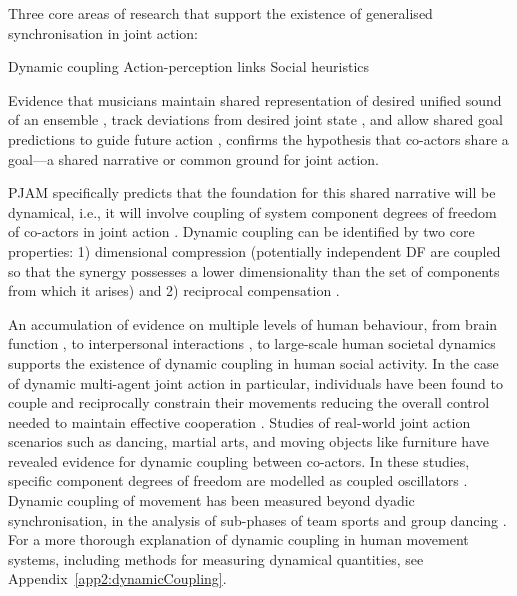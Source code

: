 \begin{CJK}{UTF8}{gbsn}
Three core areas of research that support the existence of generalised synchronisation in joint action:

Dynamic coupling
Action-perception links
Social heuristics




Evidence that musicians maintain shared representation of desired unified sound of an ensemble \citep{Keller2008}, track deviations from desired joint state \citep{Loehr2013}, and allow shared goal predictions to guide future action \citep{Loehr2016}, confirms the hypothesis that co-actors share a goal---a shared narrative or common ground for joint action.

PJAM specifically predicts that the foundation for this shared narrative will be dynamical, i.e., it will involve coupling of system component degrees of freedom of co-actors in joint action \citep{Turvey1978,Schmidt1990}. Dynamic coupling can be identified by two core properties:  1) dimensional compression (potentially independent DF are coupled so that the synergy possesses a lower dimensionality than the set of components from which it arises) and 2) reciprocal compensation \citep[the ability of one component of a synergy to react to changes in others][]{Riley2011}.

An accumulation of evidence on multiple levels of human behaviour, from brain function \citep{Yufik1998,Sengupta2013}, to interpersonal interactions \citep{Kelso2009,Riley2011,Fusaroli2014}, to large-scale human societal dynamics \citep{Nowak2017} supports the existence of dynamic coupling in human social activity.  In the case of dynamic multi-agent joint action in particular, individuals have been found to couple and reciprocally constrain their movements reducing the overall control needed to maintain effective cooperation \citep{Ramenzoni2011,Ramenzoni2012,Riley2011,Schmidt1990}.  Studies of real-world joint action scenarios such as dancing, martial arts, and moving objects like furniture have revealed evidence for dynamic coupling between co-actors.  In these studies, specific component degrees of freedom are modelled as coupled oscillators \citep[using the HKB model, which describes the change in the relative phase between two oscillatory components. See][]{Haken1985,Kelso1986}.  Dynamic coupling of movement has been measured beyond dyadic synchronisation, in the analysis of sub-phases of team sports  \citep{Passos2014,Duarte2012} and group dancing \citep{Chauvigne2017}.  For a more thorough explanation of dynamic coupling in human movement systems, including methods for measuring dynamical quantities, see Appendix~\ref{app2:dynamicCoupling}.


\end{CJK}
